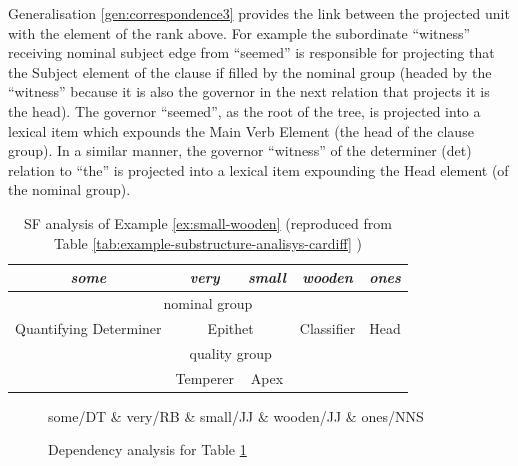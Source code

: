 Generalisation \ref{gen:correspondence3} provides the link between the projected unit with the element of the rank above. For example the subordinate ``witness'' receiving  nominal subject edge from ``seemed'' is responsible for projecting that the Subject element of the clause if filled by the nominal group (headed by the ``witness'' because it is also the governor in the next relation that projects it is the head). The governor ``seemed'', as the root of the tree, is projected into a lexical item which expounds the Main Verb Element (the head of the clause group). In a similar manner, the governor ``witness'' of the determiner (det) relation to ``the'' is projected into a lexical item expounding the Head element (of the nominal group). 


\begin{table}[ht]
	\centering
	\begin{tabular}{c|c|c|cc}
        \hline
        \multicolumn{1}{|c|}{\textit{some}}          & \textit{very}   & \textit{small}   & \multicolumn{1}{c|}{\textit{wooden}} & \multicolumn{1}{c|}{\textit{ones}} \\ \hline
        \multicolumn{5}{|c|}{nominal group}                                                                                                                           \\ \hline
        \multicolumn{1}{|c|}{Quantifying Determiner} & \multicolumn{2}{c|}{Epithet}       & \multicolumn{1}{c|}{Classifier}      & \multicolumn{1}{c|}{Head}          \\ \hline
        & \multicolumn{2}{c|}{quality group} &                                      &                                    \\ \cline{2-3}
        & Temperer        & Apex             &                                      &                                    \\ \cline{2-3}
    \end{tabular}
	\caption{SF analysis of Example \ref{ex:small-wooden} (reproduced from Table \ref{tab:example-substructure-analisys-cardiff} )}
	\label{tab:example-substructure-analisys-cardiff-repeated}
\end{table}

\begin{figure}[ht]
	\centering
	\begin{dependency}
		\begin{deptext}[]
			some/DT \& very/RB \& small/JJ \& wooden/JJ \& ones/NNS \\
		\end{deptext}
	\end{dependency}
	\caption{Dependency analysis for Table \ref{tab:example-substructure-analisys-cardiff-repeated} }
	\label{fig:small-wooden-dependecy}
\end{figure}

